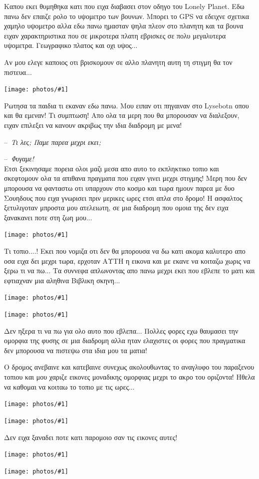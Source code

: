 \documentclass[11pt, letterpaper]{book}
\newcommand\dialogue[1]{\par\noindent--~\textit{#1}}
\newcommand\photo[1]{\begin{center}\noindent\texttt{[image: photos/\#1]}\end{center}}
\begin{document}
Καπου εκει θυμηθηκα κατι που ειχα διαβασει στον οδηγο του Lonely Planet. Εδω πανω δεν επαιζε ρολο το υψομετρο των βουνων. Μπορει το GPS να εδειχνε σχετικα χαμηλο υψομετρο αλλα εδω πανω ημασταν ψηλα πλεον στο πλανητη και τα βουνα ειχαν χαρακτηριστικα που σε μικροτερα πλατη εβρισκες σε πολυ μεγαλυτερα υψομετρα. Γεωγραφικο πλατος και οχι υψος...

Αν μου ελεγε καποιος οτι βρισκομουν σε αλλο πλανητη αυτη τη στιγμη θα τον πιστευα...

\photo{177.jpg}

Ρωτησα τα παιδια τι εκαναν εδω πανω. Μου ειπαν οτι πηγαιναν στο Lysebotn οπου και θα εμεναν! Τι συμπτωση! Απο ολα τα μερη που θα μπορουσαν να διαλεξουν, ειχαν επιλεξει να κανουν ακριβως την ιδια διαδρομη με μενα!\\

\dialogue{Τι λες; Παμε παρεα μεχρι εκει;}
\dialogue{Φυγαμε!}\\

Ετσι ξεκινησαμε πορεια ολοι μαζι μεσα απο αυτο το εκπληκτικο τοπιο και σκεφτομουν ολα τα απιθανα πραγματα που ειχαν γινει μεχρι στιγμης! Μερη που δεν μπορουσα να φανταστω οτι υπαρχουν στο κοσμο και τωρα ημουν παρεα με δυο Σουηδους που ειχα γνωρισει πριν μερικες ωρες ετσι απλα στο δρομο!
Η ασφαλτος ξετυλιγοταν μπροστα μου ατελειωτη, σε μια διαδρομη που ομοια της δεν ειχα ξανακανει ποτε στη ζωη μου...

\photo{178.jpg}

Τι τοπιο....! Εκει που νομιζα οτι δεν θα μπορουσα να δω κατι ακομα καλυτερο απο οσα ειχα δει μεχρι τωρα, ερχοταν ΑΥΤΗ η εικονα και με εκανε να κοιταζω χωρις να ξερω τι να πω... Τα συννεφα απλωνοντας απο πανω μεχρι εκει που εβλεπε το ματι και εφτιαχναν μια αληθινα Βιβλικη σκηνη... 

\photo{179.jpg}
\photo{180.jpg}

Δεν ηξερα τι να πω για ολο αυτο που εβλεπα... Πολλες φορες εχω θαυμασει την ομορφια της φυσης σε μια διαδρομη αλλα ηταν ελαχιστες οι φορες που πραγματικα δεν μπορουσα να πιστεψω στα ιδια μου τα ματια! 

Ο δρομος ανεβαινε και κατεβαινε συνεχως ακολουθωντας το αναγλυφο του παραξενου τοπιου και μου χαριζε εικονες μοναδικης ομορφιας μεχρι το ακρο του οριζοντα! 
Ηθελα να καθομαι να κοιταω το τοπιο με τις ωρες...

\photo{181.jpg}
\photo{182.jpg}

Δεν ειχα ξαναδει ποτε κατι παρομοιο σαν τις εικονες αυτες! 

\photo{183.jpg}
\photo{184.jpg}
\end{document}
